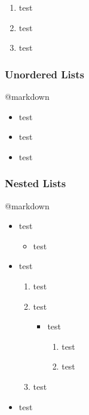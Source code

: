 \documentclass[]{article}
\providecommand{\tightlist}{%
  \setlength{\itemsep}{0pt}\setlength{\parskip}{0pt}}
\begin{document}
\begin{enumerate}
\def\labelenumi{\arabic{enumi}.}
\tightlist
\item
  test
\item
  test
\item
  test
\end{enumerate}

\subsubsection{Unordered Lists}\label{unordered-lists}

@markdown

\begin{itemize}
\tightlist
\item
  test
\item
  test
\item
  test
\end{itemize}

\subsubsection{Nested Lists}\label{nested-lists}

@markdown

\begin{itemize}
\tightlist
\item
  test

  \begin{itemize}
  \tightlist
  \item
    test
  \end{itemize}
\item
  test

  \begin{enumerate}
  \def\labelenumi{\arabic{enumi}.}
  \tightlist
  \item
    test
  \item
    test

    \begin{itemize}
    \tightlist
    \item
      test

      \begin{enumerate}
      \def\labelenumii{\arabic{enumii}.}
      \tightlist
      \item
        test
      \item
        test
      \end{enumerate}
    \end{itemize}
  \item
    test
  \end{enumerate}
\item
  test
\end{itemize}
\end{document}
